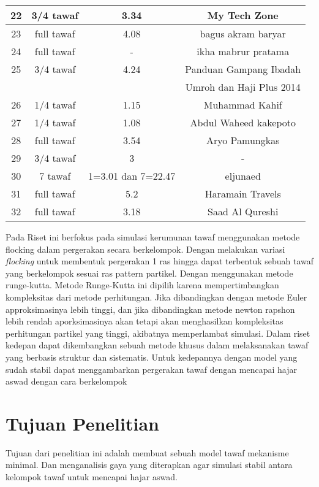 \begin{table}[H]
\begin{tabular}{|c|c|c|c|}
\hline
22&3/4 tawaf&	3.34&My Tech Zone\\
\hline
23&full tawaf&	4.08&bagus akram baryar\\

\hline
24&full tawaf&	-&ikha mabrur pratama\\

\hline
25&3/4 tawaf&	4.24&Panduan Gampang Ibadah \\
& & &Umroh dan Haji  Plus 2014\\
	
\hline
26&1/4 tawaf &	1.15&Muhammad Kahif\\

\hline
27&1/4 tawaf &	1.08&Abdul Waheed kakepoto\\
	
\hline
28&full tawaf&	3.54&	Aryo Pamungkas\\

\hline
29&3/4 tawaf&	3&-\\

\hline
30&7 tawaf&	1=3.01 dan 7=22.47&eljunaed\\
\hline
31&full tawaf&	5.2&Haramain Travels\\

\hline
32&full tawaf&	3.18&Saad Al Qureshi\\
\hline

\end{tabular}
\end{table}

		
\hspace{0.6cm}Pada Riset ini berfokus pada simulasi kerumunan tawaf menggunakan metode flocking dalam pergerakan secara berkelompok. Dengan melakukan variasi \emph{flocking} untuk membentuk pergerakan 1 ras hingga dapat terbentuk sebuah tawaf yang berkelompok sesuai ras pattern partikel. Dengan menggunakan metode runge-kutta. Metode Runge-Kutta ini dipilih karena mempertimbangkan kompleksitas dari metode perhitungan. Jika dibandingkan dengan metode Euler approksimasinya lebih tinggi, dan jika dibandingkan metode newton rapshon lebih rendah aporksimasinya akan tetapi akan menghasilkan kompleksitas perhitungan partikel yang tinggi, akibatnya memperlambat simulasi.
Dalam riset kedepan dapat dikembangkan sebuah metode khusus dalam melaksanakan tawaf yang berbasis struktur dan sistematis. Untuk kedepannya dengan model yang sudah stabil dapat menggambarkan pergerakan tawaf dengan mencapai hajar aswad dengan cara berkelompok   

\section{Tujuan Penelitian}\label{sec:tujuan}
\hspace{0.6cm}Tujuan dari penelitian ini adalah membuat sebuah model tawaf mekanisme minimal. Dan menganalisis gaya yang diterapkan agar simulasi stabil antara kelompok tawaf untuk mencapai hajar aswad.


